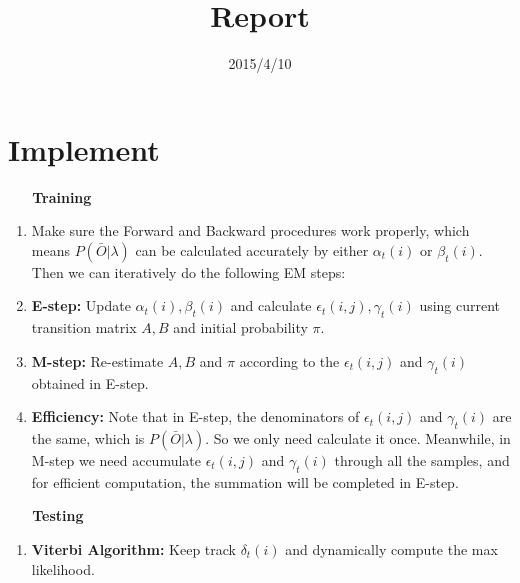 \documentclass[11pt, oneside]{article}   	%
\title{Report}
\date{2015/4/10}							%
\begin{document}
\maketitle

\section{Implement}
\noindent \textbf{\ \ \ Training}
\begin{enumerate}
\item Make sure the Forward and Backward procedures work properly, which means $P( \bar{O}  | \lambda)$ can be calculated accurately  by either $\alpha_t(i)$ or  $\beta_t(i)$. Then we can iteratively do the following EM steps:
\item \textbf{E-step:} Update $\alpha_t(i), \beta_t(i)$ and calculate $\epsilon_t(i,j), \gamma_t(i)$ using current transition matrix $A, B$ and initial probability $\pi$. 
\item \textbf{M-step:} Re-estimate  $A,B$ and $\pi$ according to the $\epsilon_t(i,j)$ and $\gamma_t(i)$ obtained in E-step.
\item \textbf{Efficiency:} Note that in E-step, the denominators of $\epsilon_t(i,j)$ and $\gamma_t(i)$ are the same, which is $P( \bar{O}  | \lambda)$. So we only need calculate it once. Meanwhile,  in M-step we need accumulate $\epsilon_t(i,j)$ and $\gamma_t(i)$ through all the samples, and for efficient computation, the summation will be completed in E-step.
\end{enumerate}
\textbf{\ \ \ Testing}
\begin{enumerate}
\item \textbf{Viterbi Algorithm:} Keep track $\delta_t(i)$ and dynamically compute the max likelihood.
\end{enumerate}
\end{document}
